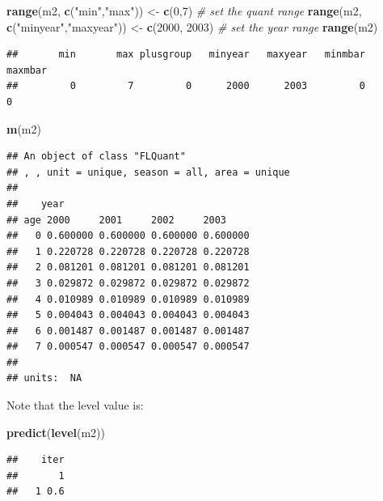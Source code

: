 \documentclass[
]{book}
\newenvironment{Shaded}{\begin{snugshade}}{\end{snugshade}}
\newcommand{\CommentTok}[1]{\textcolor[rgb]{0.56,0.35,0.01}{\textit{#1}}}
\newcommand{\DecValTok}[1]{\textcolor[rgb]{0.00,0.00,0.81}{#1}}
\newcommand{\FunctionTok}[1]{\textcolor[rgb]{0.13,0.29,0.53}{\textbf{#1}}}
\newcommand{\NormalTok}[1]{#1}
\newcommand{\OtherTok}[1]{\textcolor[rgb]{0.56,0.35,0.01}{#1}}
\newcommand{\StringTok}[1]{\textcolor[rgb]{0.31,0.60,0.02}{#1}}
\begin{document}
\begin{Shaded}
\begin{Highlighting}[]
\FunctionTok{range}\NormalTok{(m2, }\FunctionTok{c}\NormalTok{(}\StringTok{"min"}\NormalTok{,}\StringTok{"max"}\NormalTok{)) }\OtherTok{\textless{}{-}} \FunctionTok{c}\NormalTok{(}\DecValTok{0}\NormalTok{,}\DecValTok{7}\NormalTok{) }\CommentTok{\# set the quant range}
\FunctionTok{range}\NormalTok{(m2, }\FunctionTok{c}\NormalTok{(}\StringTok{"minyear"}\NormalTok{,}\StringTok{"maxyear"}\NormalTok{)) }\OtherTok{\textless{}{-}} \FunctionTok{c}\NormalTok{(}\DecValTok{2000}\NormalTok{, }\DecValTok{2003}\NormalTok{) }\CommentTok{\# set the year range}
\FunctionTok{range}\NormalTok{(m2)}
\end{Highlighting}
\end{Shaded}

\begin{verbatim}
##       min       max plusgroup   minyear   maxyear   minmbar   maxmbar 
##         0         7         0      2000      2003         0         0
\end{verbatim}

\begin{Shaded}
\begin{Highlighting}[]
\FunctionTok{m}\NormalTok{(m2)}
\end{Highlighting}
\end{Shaded}

\begin{verbatim}
## An object of class "FLQuant"
## , , unit = unique, season = all, area = unique
## 
##    year
## age 2000     2001     2002     2003    
##   0 0.600000 0.600000 0.600000 0.600000
##   1 0.220728 0.220728 0.220728 0.220728
##   2 0.081201 0.081201 0.081201 0.081201
##   3 0.029872 0.029872 0.029872 0.029872
##   4 0.010989 0.010989 0.010989 0.010989
##   5 0.004043 0.004043 0.004043 0.004043
##   6 0.001487 0.001487 0.001487 0.001487
##   7 0.000547 0.000547 0.000547 0.000547
## 
## units:  NA
\end{verbatim}

Note that the level value is:

\begin{Shaded}
\begin{Highlighting}[]
\FunctionTok{predict}\NormalTok{(}\FunctionTok{level}\NormalTok{(m2))}
\end{Highlighting}
\end{Shaded}

\begin{verbatim}
##    iter
##       1
##   1 0.6
\end{verbatim}
\end{document}
